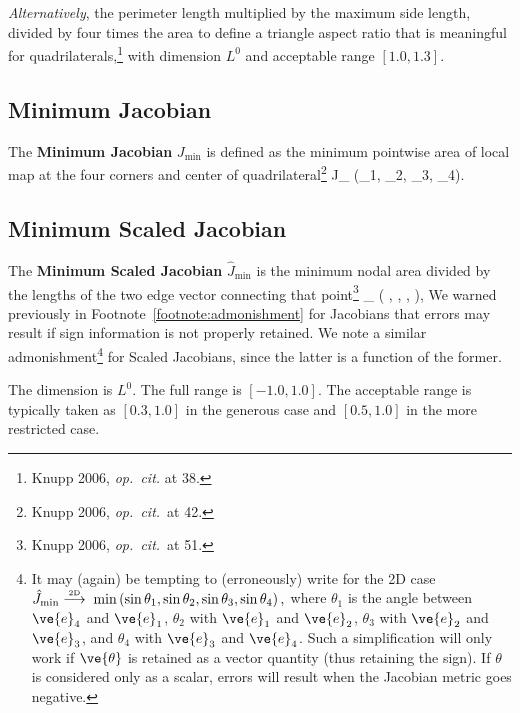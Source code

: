 \documentclass[14pt,letterpaper,fleqn]{extreport}
\begin{document}
{\em Alternatively}, the perimeter length multiplied by the maximum side length, 
divided by four times the area to define a triangle aspect ratio that is 
meaningful for quadrilaterals,\footnote{Knupp 2006, {\em op.~cit.} at 38.} with 
dimension $L^0$ and acceptable range $[1.0, 1.3]$.


\subsection{Minimum Jacobian}
The {\bf Minimum Jacobian} $J_{\min}$ is defined as the minimum pointwise area of local 
map at the four corners and center of quadrilateral\footnote{Knupp 2006, {\em op.~cit.}~at 42.}
\be 
J_{\min}  \min \left(\alpha_1, \alpha_2, \alpha_3, \alpha_4\right).
\ee 

\subsection{Minimum Scaled Jacobian}

The {\bf Minimum Scaled Jacobian} $\hat{J}_{\min}$ is the minimum nodal area divided by the 
lengths of the two edge vector connecting that point\footnote{Knupp 2006, {\em op.~cit.}~at 51.}
\be 
{}_{\min}  \min
  \left(
    , 
    ,
    ,
  \right),
\ee 
%
We warned previously in Footnote~\ref{footnote:admonishment} for Jacobians that 
errors may result if sign information is not properly retained.  We 
note a similar admonishment\footnote{It may (again) be tempting to (erroneously) 
write for the 2D case 
$\hat{J}_{\min} \overset{\tiny \mbox{2D}}{\longrightarrow} \; \min
  \left(
    \sin \theta_1, \sin \theta_2, \sin \theta_3, \sin \theta_4
  \right),$
where $\theta_1$ is the angle between $\ve{e}_4$ and $\ve{e}_1$, 
$\theta_2$ with $\ve{e}_1$ and $\ve{e}_2$, 
$\theta_3$ with $\ve{e}_2$ and $\ve{e}_3$, and
$\theta_4$ with $\ve{e}_3$ and $\ve{e}_4$.
Such a simplification will only work if $\ve{\theta}$ is retained as a vector quantity (thus 
retaining the sign).  If $\theta$ is considered only as a scalar, errors will result when
the Jacobian metric goes negative.} for Scaled Jacobians, since the latter is a function of the
former.

The dimension is $L^0$.  
The full range is  $[-1.0, 1.0]$.  
The acceptable range is typically taken as $[0.3, 1.0]$ in the generous case and 
$[0.5, 1.0]$ in the more restricted case.


\end{document}

